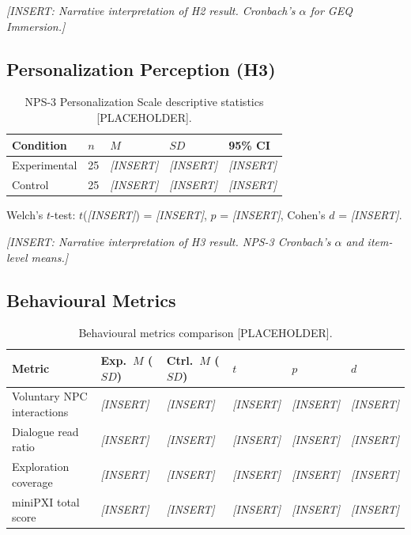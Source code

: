 \documentclass[12pt,a4paper]{report}
\begin{document}
\textit{[INSERT: Narrative interpretation of H2 result. Cronbach's $\alpha$ for GEQ Immersion.]}

\subsection{Personalization Perception (H3)}

\begin{table}[H]
\centering
\caption{NPS-3 Personalization Scale descriptive statistics [PLACEHOLDER].}
\label{tab:nps3}
\small
\begin{tabular}{@{}lllll@{}}
\toprule
\textbf{Condition} & $n$ & $M$ & $SD$ & \textbf{95\% CI} \\
\midrule
Experimental & 25 & \textit{[INSERT]} & \textit{[INSERT]} & \textit{[INSERT]} \\
Control & 25 & \textit{[INSERT]} & \textit{[INSERT]} & \textit{[INSERT]} \\
\bottomrule
\end{tabular}
\end{table}

Welch's $t$-test: $t$(\textit{[INSERT]}) = \textit{[INSERT]}, $p$ = \textit{[INSERT]}, Cohen's $d$ = \textit{[INSERT]}.

\textit{[INSERT: Narrative interpretation of H3 result. NPS-3 Cronbach's $\alpha$ and item-level means.]}

\subsection{Behavioural Metrics}

\begin{table}[H]
\centering
\caption{Behavioural metrics comparison [PLACEHOLDER].}
\label{tab:behavioural}
\small
\begin{tabular}{@{}llllll@{}}
\toprule
\textbf{Metric} & \textbf{Exp.\ $M$ ($SD$)} & \textbf{Ctrl.\ $M$ ($SD$)} & $t$ & $p$ & $d$ \\
\midrule
Voluntary NPC interactions & \textit{[INSERT]} & \textit{[INSERT]} & \textit{[INSERT]} & \textit{[INSERT]} & \textit{[INSERT]} \\
Dialogue read ratio & \textit{[INSERT]} & \textit{[INSERT]} & \textit{[INSERT]} & \textit{[INSERT]} & \textit{[INSERT]} \\
Exploration coverage & \textit{[INSERT]} & \textit{[INSERT]} & \textit{[INSERT]} & \textit{[INSERT]} & \textit{[INSERT]} \\
miniPXI total score & \textit{[INSERT]} & \textit{[INSERT]} & \textit{[INSERT]} & \textit{[INSERT]} & \textit{[INSERT]} \\
\bottomrule
\end{tabular}
\end{table}
\end{document}
